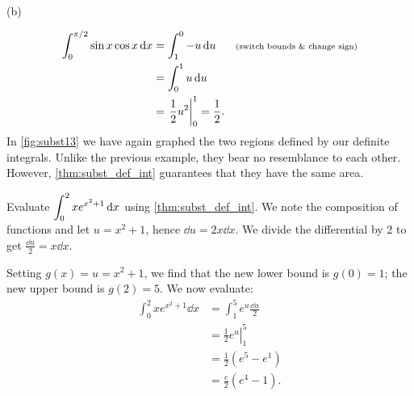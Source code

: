 \begin{example}
{\begin{tikzpicture}[alt={Graph (b) blue line y = u; area under line shaded from u = 0 to 1; axes u and y.}]
\end{tikzpicture}
\\(b)}
%
\begin{align*}
	\int_0^{\pi/2} \sin x\cos x\operatorname{d}\! x
	&= \int_1^0 -u\operatorname{d}\! u && \text{\scriptsize (switch bounds \& change sign)}\\
	&= \int_0^1 u\operatorname{d}\! u\\
	&= \left.\frac12u^2\right|_0^1= \frac12.
\end{align*}
In \autoref{fig:subst13} we have again graphed the two regions defined by our definite integrals. Unlike the previous example, they bear no resemblance to each other. However, \autoref{thm:subst_def_int} guarantees that they have the same area.
\end{example}

\begin{example}\label{ex_subst_def_3}%
Evaluate $\displaystyle\int_0^2 xe^{x^2+1}\operatorname{d}\! x$ using \autoref{thm:subst_def_int}.
\solution
We note the composition of functions and let $u=x^2+1$, hence $\dd u=2x\dd x$. We divide the differential by 2 to get $\frac{\dd u}2=x\dd x$.

Setting $g(x)=u=x^2+1$, we find that the new lower bound is $g(0)=1$; the new upper bound is $g(2)=5$. We now evaluate:
\begin{align*}
	\int_0^2 xe^{x^2+1}\dd x
	&= \int_1^5 e^u \frac{\dd u}2\\
	&= \left.\frac12 e^u\right|_1^5\\
	&= \frac12(e^5-e^1) \\
	&= \frac e2(e^4-1). %
\end{align*}
\end{example}




